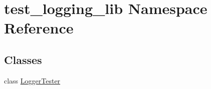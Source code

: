 \section{test\-\_\-logging\-\_\-lib Namespace Reference}
\label{namespacetest__logging__lib}
\subsection*{Classes}
\begin{DoxyCompactItemize}
\item 
class \hyperlink{classtest__logging__lib_1_1LoggerTester}{Logger\-Tester}
\end{DoxyCompactItemize}
